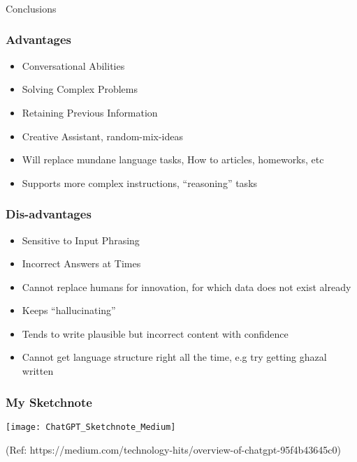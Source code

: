 \begin{frame}[fragile]\frametitle{}
\begin{center}
{\Large Conclusions}
\end{center}
\end{frame}




\begin{frame}[fragile]\frametitle{Advantages}


\begin{itemize}
\item Conversational Abilities
\item Solving Complex Problems
\item Retaining Previous Information
\item Creative Assistant, random-mix-ideas
\item Will replace mundane language tasks, How to articles, homeworks, etc
\item Supports more complex instructions, ``reasoning'' tasks
\end{itemize}	 

\end{frame}

\begin{frame}[fragile]\frametitle{Dis-advantages}


\begin{itemize}
\item Sensitive to Input Phrasing
\item Incorrect Answers at Times
\item Cannot replace humans for innovation, for which data does not exist already
\item Keeps ``hallucinating''
\item Tends to write plausible but incorrect content with confidence
\item Cannot get language structure right all the time, e.g try getting ghazal written
\end{itemize}	 

\end{frame}



\begin{frame}[fragile]\frametitle{My Sketchnote}

\begin{center}
\texttt{[image: ChatGPT\_Sketchnote\_Medium]}
\end{center}		

{\tiny (Ref: https://medium.com/technology-hits/overview-of-chatgpt-95f4b43645c0)}
			

\end{frame}


